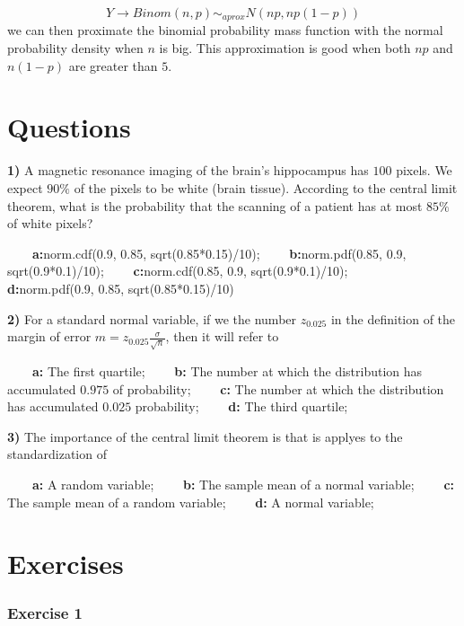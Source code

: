 \documentclass[
]{book}
\begin{document}
\[Y \rightarrow  Binom(n, p) \sim_{aprox}  N(np, np(1-p))\]
we can then proximate the binomial probability mass function with the normal probability density when \(n\) is big. This approximation is good when both \(np\) and \(n(1-p)\) are greater than \(5\).

\hypertarget{questions-8}{%
\section{Questions}\label{questions-8}}

\textbf{1)} A magnetic resonance imaging of the brain's hippocampus has \(100\) pixels. We expect \(90\%\) of the pixels to be white (brain tissue). According to the central limit theorem, what is the probability that the scanning of a patient has at most \(85\%\) of white pixels?

\textbf{\(\qquad\)a:}norm.cdf(0.9, 0.85, sqrt(0.85*0.15)/10); \textbf{\(\qquad\)b:}norm.pdf(0.85, 0.9,
sqrt(0.9*0.1)/10); \textbf{\(\qquad\)c:}norm.cdf(0.85, 0.9, sqrt(0.9*0.1)/10); \textbf{\(\qquad\)d:}norm.pdf(0.9, 0.85, sqrt(0.85*0.15)/10)

\textbf{2)} For a standard normal variable, if we the number \(z_{0.025}\) in the definition of the margin of error \(m=z_{0.025} \frac{\sigma}{\sqrt{n}}\), then it will refer to

\textbf{\(\qquad\)a:} The first quartile; \textbf{\(\qquad\)b:} The number at which the distribution has accumulated \(0.975\) of probability; \textbf{\(\qquad\)c:} The number at which the distribution has accumulated \(0.025\) probability; \textbf{\(\qquad\)d:} The third quartile;

\textbf{3)} The importance of the central limit theorem is that is applyes to the standardization of

\textbf{\(\qquad\)a:} A random variable;
\textbf{\(\qquad\)b:} The sample mean of a normal variable;
\textbf{\(\qquad\)c:} The sample mean of a random variable;
\textbf{\(\qquad\)d:} A normal variable;

\hypertarget{exercises-9}{%
\section{Exercises}\label{exercises-9}}

\hypertarget{exercise-1-8}{%
\subsubsection{Exercise 1}\label{exercise-1-8}}
\end{document}
